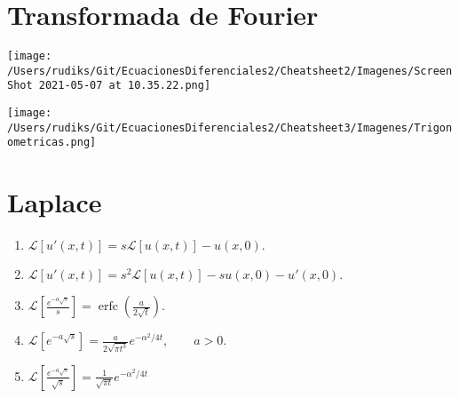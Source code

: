 \section{Transformada de Fourier}

\begin{center}
	\texttt{[image: /Users/rudiks/Git/EcuacionesDiferenciales2/Cheatsheet2/Imagenes/Screen Shot 2021-05-07 at 10.35.22.png]}
\end{center}

\begin{center}
	\texttt{[image: /Users/rudiks/Git/EcuacionesDiferenciales2/Cheatsheet3/Imagenes/Trigonometricas.png]}
\end{center}



\section{Laplace}
\begin{enumerate}
	\item $\mathcal{L}[u'(x,t)]=s\mathcal{L}[u(x,t)]-u(x,0).$
	\item $\mathcal{L}[u'(x,t)]=s^2\mathcal{L}[u(x,t)]-su(x,0)-u'(x,0).$
	\item$\mathcal{L}\left[\frac{e^{-a\sqrt{s}}}{s}\right]=\operatorname{erfc}\left(\frac{a}{2\sqrt{t}}\right).$
	\item $\mathcal{L}\left[e^{-a\sqrt{s}}\right]=\frac{a}{2\sqrt{\pi t^3}}e^{-\alpha ^2 /4t}, \qquad a>0.$
	\item  $\mathcal{L}\left[\frac{e^{-a\sqrt{s}}}{\sqrt{s}}\right]=\frac{1}{\sqrt{\pi t}}e^{-\alpha ^2 /4t}$
\end{enumerate}


%
%

